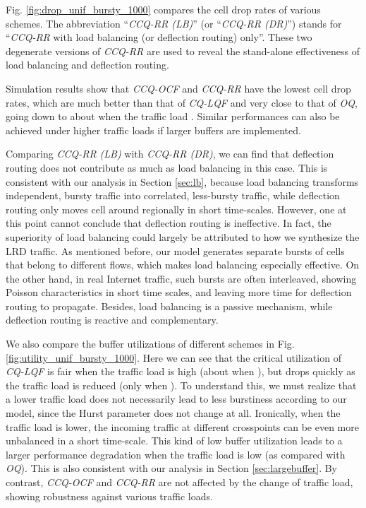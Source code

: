 \documentclass[journal,final,doublecolumn,10pt,twoside]{IEEEtranTCOM} \normalsize
\begin{document}
Fig. \ref{fig:drop_unif_bursty_1000} compares the cell drop rates of various schemes. The abbreviation ``\emph{CCQ-RR (LB)}'' (or ``\emph{CCQ-RR (DR)}'') stands for ``\emph{CCQ-RR} with load balancing (or deflection routing) only''. These two degenerate versions of \emph{CCQ-RR} are used to reveal the stand-alone effectiveness of load balancing and deflection routing.

Simulation results show that \emph{CCQ-OCF} and \emph{CCQ-RR} have the lowest cell drop rates, which are much better than that of \emph{CQ-LQF} and very close to that of \emph{OQ}, going down to about  when the traffic load . Similar performances can also be achieved under higher traffic loads if larger buffers are implemented. 

Comparing \emph{CCQ-RR (LB)} with \emph{CCQ-RR (DR)}, we can find that deflection routing does not contribute as much as load balancing in this case. This is consistent with our analysis in Section \ref{sec:lb}, because load balancing transforms independent, bursty traffic into correlated, less-bursty traffic, while deflection routing only moves cell around regionally in short time-scales. However, one at this point cannot conclude that deflection routing is ineffective. In fact, the superiority of load balancing could largely be attributed to how we synthesize the LRD traffic. As mentioned before, our model generates separate bursts of cells that belong to different flows, which makes load balancing especially effective. On the other hand, in real Internet traffic, such bursts are often interleaved, showing Poisson characteristics in short time scales, and leaving more time for deflection routing to propagate. Besides, load balancing is a passive mechanism, while deflection routing is reactive and complementary.

We also compare the buffer utilizations of different schemes in Fig. \ref{fig:utility_unif_bursty_1000}. Here we can see that the critical utilization of \emph{CQ-LQF} is fair when the traffic load is high (about  when ), but drops quickly as the traffic load is reduced (only  when ). To understand this, we must realize that a lower traffic load does not necessarily lead to less burstiness according to our model, since the Hurst parameter does not change at all. Ironically, when the traffic load is lower, the incoming traffic at different crosspoints can be even more unbalanced in a short time-scale. This kind of low buffer utilization leads to a larger performance degradation when the traffic load is low (as compared with \emph{OQ}). This is also consistent with our analysis in Section \ref{sec:largebuffer}. By contrast, \emph{CCQ-OCF} and \emph{CCQ-RR} are not affected by the change of traffic load, showing robustness against various traffic loads.
\end{document}
